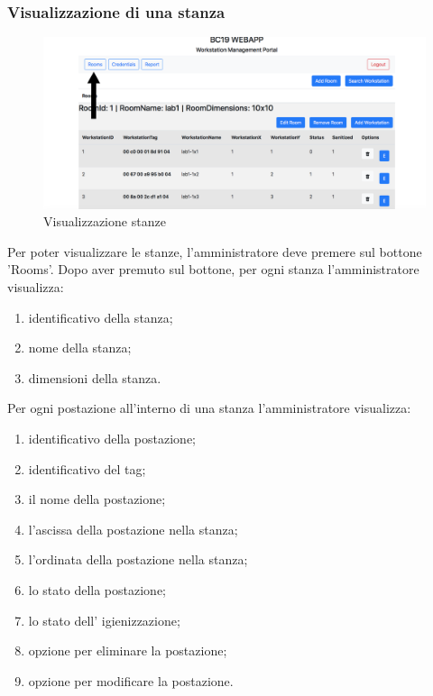 \subsubsection{Visualizzazione di una stanza}
\begin{figure}[H]
	\centering
	\includegraphics[width=15cm]{res/images/visStanza.png}
	\caption{Visualizzazione stanze}
\end{figure}
Per poter visualizzare le stanze, l'amministratore deve premere sul bottone 'Rooms'.
Dopo aver premuto sul bottone, per ogni stanza l'amministratore visualizza:
\begin{enumerate}
\item identificativo della stanza;
\item nome della stanza;
\item dimensioni della stanza.
\end{enumerate}
Per ogni postazione all'interno di una stanza l'amministratore visualizza:
\begin{enumerate}
\item identificativo della postazione;
\item identificativo del tag;
\item il nome della postazione;
\item l'ascissa della postazione nella stanza;
\item l'ordinata della postazione nella stanza;
\item lo stato della postazione;
\item lo stato dell' igienizzazione;
\item opzione per eliminare la postazione;
\item opzione per modificare la postazione.

\end{enumerate}

